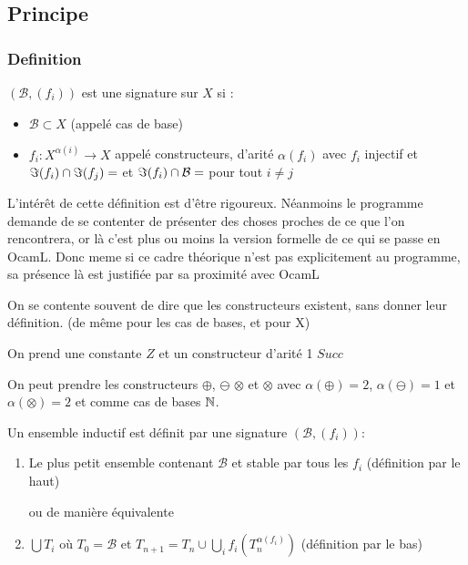 
\subsection{Principe}
\subsubsection{Definition}

\begin{definition}
	$(\mathcal B, (f_i))$ est une signature sur $X$ si : \begin{itemize}	
	\item $\mathcal B \subset X$ (appelé cas de base)
	
	\item $f_i : X^{\alpha(i)} \to X$ appelé constructeurs, d'arité $\alpha(f_i)$ avec $f_i$ injectif et $\Im(f_i) \cap \Im(f_j) = \empty$ et $\Im(f_i) \cap \mathcal B = \empty$ pour tout $i \neq j$
	\end{itemize}
\end{definition}

\begin{com}
	L'intérêt de cette définition est d'être rigoureux. Néanmoins le programme demande de se contenter de présenter des choses proches de ce que l'on rencontrera, or là c'est plus ou moins la version formelle de ce qui se passe en OcamL. Donc meme si ce cadre théorique n'est pas explicitement au programme, sa présence là est justifiée par sa proximité avec OcamL
\end{com}

\begin{rem}
	On se contente souvent de dire que les constructeurs existent, sans donner leur définition. (de même pour les cas de bases, et pour X) \label{4-3}
\end{rem}

\begin{example}
	\label{4-1}
	On prend une constante $Z$ et un constructeur d'arité 1 $Succ$
\end{example}

\begin{example}
	\label{4-2}
	On peut prendre les constructeurs $\oplus$, $\ominus$ $\otimes$ et $\otimes$ avec $\alpha(\oplus) = 2$, $\alpha(\ominus) = 1$ et $\alpha(\otimes) = 2$ et comme cas de bases $\mathbb{N}$. 
\end{example}

\begin{definition}
	\label{4-4}
	Un ensemble inductif est définit par une signature $(\mathcal B, (f_i))$: \begin{enumerate}
		\item Le plus petit ensemble contenant $\mathcal B$ et stable par tous les $f_i$ (définition par le haut)
		
		ou de manière équivalente
		
		\item $\bigcup T_i$ où $T_0 = \mathcal B$ et $T_{n+1} = T_{n} \cup \bigcup\limits_{i} f_i( T_{n} ^ {\alpha(f_i)})$ (définition par le bas)
	\end{enumerate}
\end{definition}

